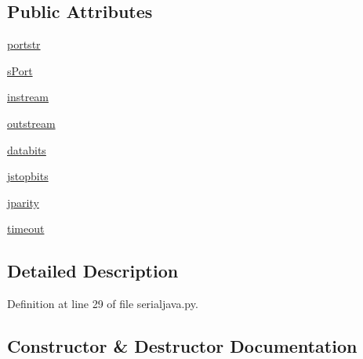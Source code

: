 \subsection*{Public Attributes}
\begin{DoxyCompactItemize}
\item 
\hyperlink{classserial_1_1serialjava_1_1_serial_ab6498afad653a048b71bf6acfa28b9fa}{portstr}
\item 
\hyperlink{classserial_1_1serialjava_1_1_serial_aaa1990322f62a49afb17fa9dbc0768f2}{s\+Port}
\item 
\hyperlink{classserial_1_1serialjava_1_1_serial_a8f441d3c724801dd6d96159e49736aec}{instream}
\item 
\hyperlink{classserial_1_1serialjava_1_1_serial_ae3abd44d3b3cdc04e372272c37a9f835}{outstream}
\item 
\hyperlink{classserial_1_1serialjava_1_1_serial_abaa47aca86acd764c31bad2b06da90dd}{databits}
\item 
\hyperlink{classserial_1_1serialjava_1_1_serial_ae48fd405b11937ade2efddcfa610c6fb}{jstopbits}
\item 
\hyperlink{classserial_1_1serialjava_1_1_serial_a198c5f67ae8aaad770a73c4646527225}{jparity}
\item 
\hyperlink{classserial_1_1serialjava_1_1_serial_a41c3f66d51a2ea75cb784ed93d23db46}{timeout}
\end{DoxyCompactItemize}


\subsection{Detailed Description}


Definition at line 29 of file serialjava.\+py.



\subsection{Constructor \& Destructor Documentation}

